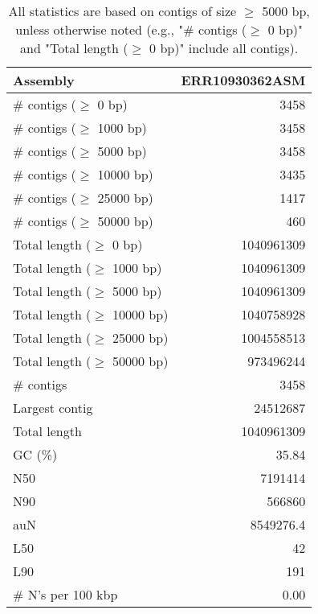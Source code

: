 \documentclass[12pt,a4paper]{article}
\begin{document}
\begin{table}[ht]
\begin{center}
\caption{All statistics are based on contigs of size $\geq$ 5000 bp, unless otherwise noted (e.g., "\# contigs ($\geq$ 0 bp)" and "Total length ($\geq$ 0 bp)" include all contigs).}
\begin{tabular}{|l*{1}{|r}|}
\hline
Assembly & ERR10930362ASM \\ \hline
\# contigs ($\geq$ 0 bp) & 3458 \\ \hline
\# contigs ($\geq$ 1000 bp) & 3458 \\ \hline
\# contigs ($\geq$ 5000 bp) & 3458 \\ \hline
\# contigs ($\geq$ 10000 bp) & 3435 \\ \hline
\# contigs ($\geq$ 25000 bp) & 1417 \\ \hline
\# contigs ($\geq$ 50000 bp) & 460 \\ \hline
Total length ($\geq$ 0 bp) & 1040961309 \\ \hline
Total length ($\geq$ 1000 bp) & 1040961309 \\ \hline
Total length ($\geq$ 5000 bp) & 1040961309 \\ \hline
Total length ($\geq$ 10000 bp) & 1040758928 \\ \hline
Total length ($\geq$ 25000 bp) & 1004558513 \\ \hline
Total length ($\geq$ 50000 bp) & 973496244 \\ \hline
\# contigs & 3458 \\ \hline
Largest contig & 24512687 \\ \hline
Total length & 1040961309 \\ \hline
GC (\%) & 35.84 \\ \hline
N50 & 7191414 \\ \hline
N90 & 566860 \\ \hline
auN & 8549276.4 \\ \hline
L50 & 42 \\ \hline
L90 & 191 \\ \hline
\# N's per 100 kbp & 0.00 \\ \hline
\end{tabular}
\end{center}
\end{table}
\end{document}
